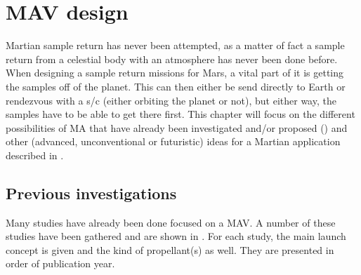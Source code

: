 \chapter{MAV design}
\label{ch:mav-des}
Martian sample return has never been attempted, as a matter of fact a sample return from a celestial body with an atmosphere has never been done before. When designing a sample return missions for Mars, a vital part of it is getting the samples off of the planet. This can then either be send directly to Earth or rendezvous with a \ac{s/c} (either orbiting the planet or not), but either way, the samples have to be able to get there first. This chapter will focus on the different possibilities of \ac{MA} that have already been investigated and/or proposed () and other (advanced, unconventional or futuristic) ideas for a Martian application described in . 



\section{Previous investigations}
\label{sec:previnv}
Many studies have already been done focused on a \ac{MAV}. A number of these studies have been gathered  and are shown in . For each study, the main launch concept is given and the kind of propellant(s) as well. They are presented in order of publication year. 


